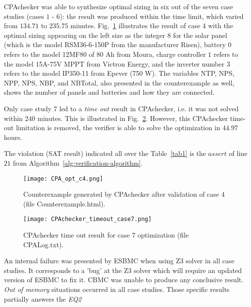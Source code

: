 CPAchecker was able to synthesize optimal sizing in six 
out of the seven case studies (cases $1$ - $6$): the result was produced within the time limit, which varied from $134.71$ to $235.75$ minutes. Fig.~\ref{fig:CPAoptc1} illustrates the result of case 4 with the optimal sizing appearing on the left size as the integer $8$ for the solar panel (which is the model RSM36-6-150P from the manufacturer Risen), battery $0$ refers to the model 12MF80 of 80 Ah from Moura, charge controller $1$ refers to the model 15A-75V MPPT from Victron  Energy, and the inverter number $3$ refers to the model IP350-11 from Epever (750 W). The variables NTP, NPS, NPP, NPS, NBP, and NBTotal, also presented in the counterexample as well, shows the number of panels and batteries and how they are connected.

Only case study $7$ led to a \textit{time out} result in CPAchecker, i.e.  it was not solved within $240$ minutes. This is illustrated in Fig.~\ref{fig:cpaoptcase7}. However, this CPAchecker time-out limitation is removed, the verifier is able to solve the optimization in $44.97$ hours. 

The violation (SAT result) indicated all over the Table~\ref{tab1} 
is the $assert$ of line $21$ from Algorithm~\ref{alg:verification-algorithm}. %

\begin{figure}[h]
\texttt{[image: CPA\_opt\_c4.png]}
\centering
\caption{Counterexample generated by CPAchecker after validation of case 4 (file Counterexample.html).}
\label{fig:CPAoptc1}
\end{figure}

\begin{figure}[h]
\texttt{[image: CPAchecker\_timeout\_case7.png]}
\centering
\caption{CPAchecker time out result for case 7 optimization (file CPALog.txt).}
\label{fig:cpaoptcase7}
\end{figure}

An internal failure was presented by ESBMC when using Z3 solver in all case studies. It corresponds to a 'bug' at the Z3 solver which will require an updated version of ESBMC to fix it. CBMC was unable to produce any conclusive result. \textit{Out of memory} situations occurred in all case studies. Those specific results partially answers the \textit{EQ2}

